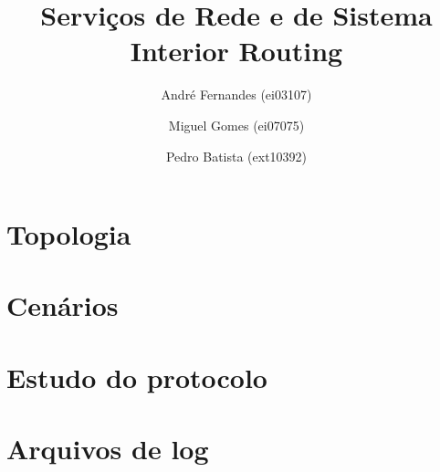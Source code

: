 \documentclass[a4paper,12pt]{article}
\title{Serviços de Rede e de Sistema \\
Interior Routing }
\author{André Fernandes (ei03107) \and Miguel Gomes (ei07075) \and Pedro Batista (ext10392)}
\begin{document}
\maketitle

\section{Topologia}

\section{Cenários}

\section{Estudo do protocolo}

\section{Arquivos de log}
\end{document}
